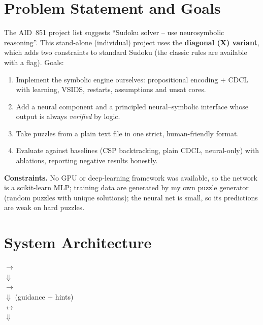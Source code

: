 \documentclass[12pt,a4paper]{article}
\begin{document}
\section{Problem Statement and Goals}
The AID~851 project list suggests ``Sudoku solver -- use neurosymbolic reasoning''. This stand-alone (individual) project uses the \textbf{diagonal (X) variant}, which adds two constraints
to standard Sudoku (the classic rules are available with a flag). Goals:
\begin{enumerate}[nosep]
  \item Implement the symbolic engine ourselves: propositional encoding + CDCL with learning, VSIDS, restarts, assumptions and unsat cores.
  \item Add a neural component and a principled neural--symbolic interface whose output is always \emph{verified} by logic.
  \item Take puzzles from a plain text file in one strict, human-friendly format.
  \item Evaluate against baselines (CSP backtracking, plain CDCL, neural-only) with ablations, reporting negative results honestly.
\end{enumerate}
\textbf{Constraints.} No GPU or deep-learning framework was available, so the network is a scikit-learn MLP; training data are generated by my own
puzzle generator (random puzzles with unique solutions); the neural net is small, so its predictions are weak on hard puzzles.

\section{System Architecture}
\begin{center}\small
{} $\rightarrow$ \\[4pt]
$\Downarrow$\\[4pt]
 $\rightarrow$ \\[4pt]
$\Downarrow$ \quad (guidance + hints)\\[4pt]
 $\leftrightarrow$ \\[4pt]
$\Downarrow$\\[4pt]
\end{center}
\end{document}
